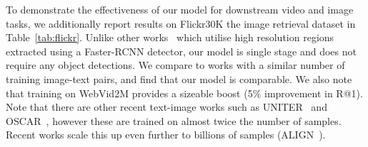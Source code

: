 \begin{table}
\centering
\caption{Text-to-video retrieval results on the LSMDC test set.}
\label{tab:lsmdc-sota}
\end{table} \label{subsec:qualitative}



To demonstrate the effectiveness of our model for downstream video and image tasks, we additionally report results on Flickr30K the image retrieval dataset in Table~\ref{tab:flickr}. Unlike other works~\cite{lee2018stacked,chen2020imram,diao2021similarity} which utilise high resolution regions extracted using a Faster-RCNN detector, our model is single stage and does not require any object detections. We compare to works with a similar number of training image-text pairs, and find that our model is comparable. We also note that training on WebVid2M provides a sizeable boost (5\% improvement in R@1). Note that there are other recent text-image works such as UNITER~\cite{chen2020uniter} and OSCAR~\cite{li2020oscar}, however these are trained on almost twice the number of samples. Recent works scale this up even further to billions of samples (ALIGN~\cite{jia2021scaling}). 

